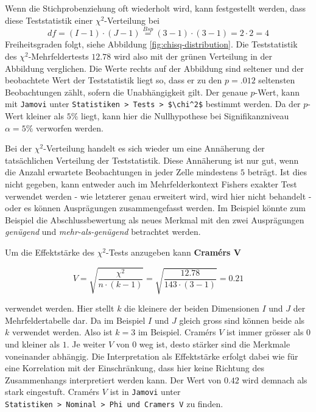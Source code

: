 \documentclass[
]{book}
\theoremstyle{definition}
\theoremstyle{definition}
\theoremstyle{definition}
\theoremstyle{definition}
\theoremstyle{remark}
\begin{document}
Wenn die Stichprobenziehung oft wiederholt wird, kann festgestellt
werden, dass diese Teststatistik einer \(\chi^2\)-Verteilung bei
\[df = (I-1)\cdot (J-1) \overset{Bsp}{=} (3-1)\cdot (3-1) = 2\cdot 2 = 4\]
Freiheitsgraden folgt, siehe Abbildung \ref{fig:chisq-distribution}. Die Teststatistik des \(\chi^2\)-Mehrfeldertests \(12.78\) wird also mit
der grünen Verteilung in der Abbildung verglichen. Die Werte rechts auf
der Abbildung sind seltener und der beobachtete Wert der Teststatistik liegt so, dass er zu den \(p = .012\) seltensten Beobachtungen zählt, sofern die Unabhängigkeit gilt. Der genaue \(p\)-Wert, kann mit \texttt{Jamovi} unter \texttt{Statistiken\ \textgreater{}\ Tests\ \textgreater{}\ \$\textbackslash{}chi\^{}2\$} bestimmt werden. Da der \(p\)-Wert kleiner als \(5\%\) liegt, kann hier die Nullhypothese bei Signifikanzniveau \(\alpha = 5\%\) verworfen werden.

Bei der \(\chi^2\)-Verteilung handelt es sich wieder um eine Annäherung der tatsächlichen Verteilung der Teststatistik. Diese Annäherung ist nur gut, wenn die Anzahl erwartete Beobachtungen in jeder Zelle mindestens \(5\) beträgt. Ist dies nicht gegeben, kann entweder auch im Mehrfelderkontext Fishers exakter Test verwendet werden - wie letzterer genau erweitert wird, wird hier nicht behandelt - oder es können Ausprägungen zusammengefasst werden. Im Beispiel könnte zum Beispiel die Abschlussbewertung als neues Merkmal mit den zwei Ausprägungen \emph{genügend} und \emph{mehr-als-genügend} betrachtet werden.

\label{customdef-cramers-v}{Um die Effektstärke des \(\chi^2\)-Tests anzugeben kann \textbf{Cramérs V}}

\[V = \sqrt{\frac{\chi^2}{n\cdot (k-1)}} = \sqrt{\frac{12.78}{143\cdot (3-1)}} = 0.21\]

verwendet werden. Hier stellt \(k\) die kleinere der beiden Dimensionen \(I\) und \(J\) der Mehrfeldertabelle dar. Da im Beispiel \(I\) und \(J\) gleich gross sind können beide als \(k\) verwendet werden. Also ist \(k = 3\) im Beispiel. Cramérs \(V\) ist immer grösser als \(0\) und kleiner als \(1\). Je weiter \(V\) von \(0\) weg ist, desto stärker sind die Merkmale voneinander abhängig. Die Interpretation als Effektstärke erfolgt dabei wie für eine Korrelation mit der Einschränkung, dass hier keine Richtung des Zusammenhangs interpretiert werden kann. Der Wert von \(0.42\) wird demnach als stark eingestuft. Cramérs \(V\) ist in \texttt{Jamovi} unter \texttt{Statistiken\ \textgreater{}\ Nominal\ \textgreater{}\ Phi\ und\ Cramer\textquotesingle{}s\ V} zu finden.
\end{document}
